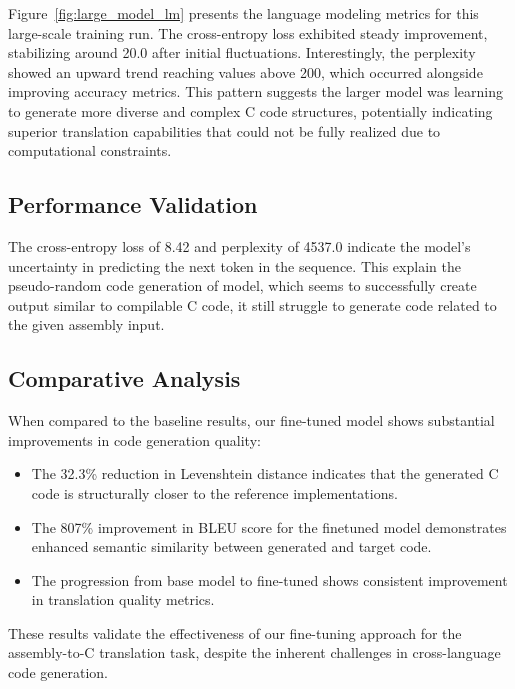 \documentclass[../main.tex]{subfiles}
\begin{document}
Figure~\ref{fig:large_model_lm} presents the language modeling metrics for this large-scale training run. The cross-entropy loss exhibited steady improvement, stabilizing around 20.0 after initial fluctuations. Interestingly, the perplexity showed an upward trend reaching values above 200, which occurred alongside improving accuracy metrics. This pattern suggests the larger model was learning to generate more diverse and complex C code structures, potentially indicating superior translation capabilities that could not be fully realized due to computational constraints.

\subsection{Performance Validation}

The cross-entropy loss of 8.42 and perplexity of 4537.0 indicate the model's uncertainty in predicting the next token in the sequence. This explain the pseudo-random code generation of model, which seems to successfully create output similar to compilable C code, it still struggle to generate code related to the given assembly input.

\subsection{Comparative Analysis}

When compared to the baseline results, our fine-tuned model shows substantial improvements in code generation quality:

\begin{itemize}
\item The 32.3\% reduction in Levenshtein distance indicates that the generated C code is structurally closer to the reference implementations.
\item The 807\% improvement in BLEU score for the finetuned model demonstrates enhanced semantic similarity between generated and target code.
\item The progression from base model to fine-tuned shows consistent improvement in translation quality metrics.
\end{itemize}

These results validate the effectiveness of our fine-tuning approach for the assembly-to-C translation task, despite the inherent challenges in cross-language code generation.
\end{document}
